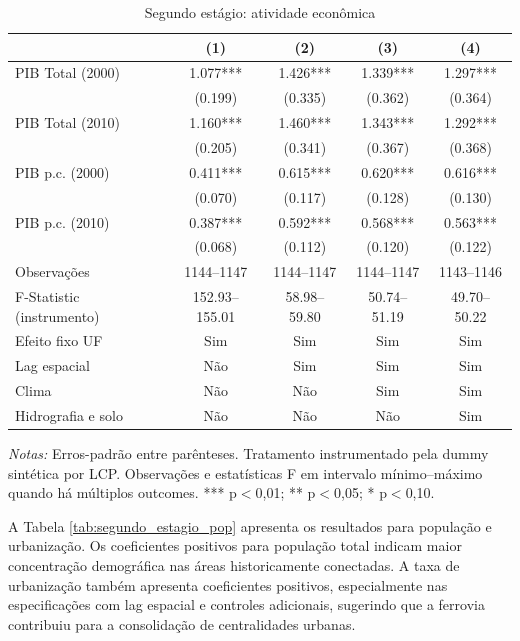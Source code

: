 \documentclass[12pt,a4paper]{article}
\begin{document}
\begin{table}[!htbp]
\centering
\scriptsize
\setlength{\tabcolsep}{3.5pt}
\renewcommand{\arraystretch}{0.80}
\caption{Segundo estágio: atividade econômica}
\label{tab:segundo_estagio_pib}
\begin{tabular}{lcccc}
\toprule
& (1) & (2) & (3) & (4) \\
\midrule
PIB Total (2000) & \num{1.077}*** & \num{1.426}*** & \num{1.339}*** & \num{1.297}*** \\
& (\num{0.199}) & (\num{0.335}) & (\num{0.362}) & (\num{0.364}) \\
PIB Total (2010) & \num{1.160}*** & \num{1.460}*** & \num{1.343}*** & \num{1.292}*** \\
& (\num{0.205}) & (\num{0.341}) & (\num{0.367}) & (\num{0.368}) \\
PIB p.c. (2000) & \num{0.411}*** & \num{0.615}*** & \num{0.620}*** & \num{0.616}*** \\
& (\num{0.070}) & (\num{0.117}) & (\num{0.128}) & (\num{0.130}) \\
PIB p.c. (2010) & \num{0.387}*** & \num{0.592}*** & \num{0.568}*** & \num{0.563}*** \\
& (\num{0.068}) & (\num{0.112}) & (\num{0.120}) & (\num{0.122}) \\
\midrule
Observações & 1144--1147 & 1144--1147 & 1144--1147 & 1143--1146 \\
F-Statistic (instrumento) & 152.93--155.01 & 58.98--59.80 & 50.74--51.19 & 49.70--50.22 \\
Efeito fixo UF & Sim & Sim & Sim & Sim \\
Lag espacial & Não & Sim & Sim & Sim \\
Clima & Não & Não & Sim & Sim \\
Hidrografia e solo & Não & Não & Não & Sim \\
\bottomrule
\end{tabular}
\begin{minipage}{0.95\textwidth}
\scriptsize \textit{Notas:} Erros-padrão entre parênteses. Tratamento instrumentado pela dummy sintética por LCP. Observações e estatísticas F em intervalo mínimo--máximo quando há múltiplos outcomes. *** p$<$0,01; ** p$<$0,05; * p$<$0,10.
\end{minipage}
\end{table}


A Tabela \ref{tab:segundo_estagio_pop} apresenta os resultados para população e urbanização. Os coeficientes positivos para população total indicam maior concentração demográfica nas áreas historicamente conectadas. A taxa de urbanização também apresenta coeficientes positivos, especialmente nas especificações com lag espacial e controles adicionais, sugerindo que a ferrovia contribuiu para a consolidação de centralidades urbanas.
\end{document}

